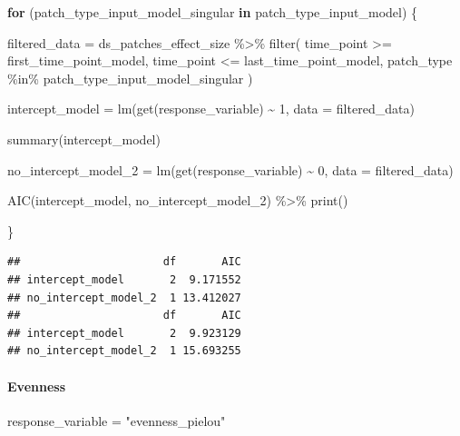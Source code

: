 \documentclass[
]{article}
\newenvironment{Shaded}{\begin{snugshade}}{\end{snugshade}}
\newcommand{\AttributeTok}[1]{\textcolor[rgb]{0.77,0.63,0.00}{#1}}
\newcommand{\ControlFlowTok}[1]{\textcolor[rgb]{0.13,0.29,0.53}{\textbf{#1}}}
\newcommand{\DecValTok}[1]{\textcolor[rgb]{0.00,0.00,0.81}{#1}}
\newcommand{\FunctionTok}[1]{\textcolor[rgb]{0.00,0.00,0.00}{#1}}
\newcommand{\NormalTok}[1]{#1}
\newcommand{\OtherTok}[1]{\textcolor[rgb]{0.56,0.35,0.01}{#1}}
\newcommand{\SpecialCharTok}[1]{\textcolor[rgb]{0.00,0.00,0.00}{#1}}
\newcommand{\StringTok}[1]{\textcolor[rgb]{0.31,0.60,0.02}{#1}}
\begin{document}
\begin{Shaded}
\begin{Highlighting}[]
\ControlFlowTok{for}\NormalTok{ (patch\_type\_input\_model\_singular }\ControlFlowTok{in}\NormalTok{ patch\_type\_input\_model) \{}
  
\NormalTok{  filtered\_data }\OtherTok{=}\NormalTok{ ds\_patches\_effect\_size }\SpecialCharTok{\%\textgreater{}\%}
    \FunctionTok{filter}\NormalTok{(}
\NormalTok{        time\_point }\SpecialCharTok{\textgreater{}=}\NormalTok{ first\_time\_point\_model,}
\NormalTok{        time\_point }\SpecialCharTok{\textless{}=}\NormalTok{ last\_time\_point\_model,}
\NormalTok{        patch\_type }\SpecialCharTok{\%in\%}\NormalTok{ patch\_type\_input\_model\_singular}
\NormalTok{    )}
  
\NormalTok{  intercept\_model }\OtherTok{=} \FunctionTok{lm}\NormalTok{(}\FunctionTok{get}\NormalTok{(response\_variable) }\SpecialCharTok{\textasciitilde{}}
                         \DecValTok{1}\NormalTok{,}
                       \AttributeTok{data =}\NormalTok{ filtered\_data)}
  
  \FunctionTok{summary}\NormalTok{(intercept\_model)}
  
\NormalTok{  no\_intercept\_model\_2 }\OtherTok{=} \FunctionTok{lm}\NormalTok{(}\FunctionTok{get}\NormalTok{(response\_variable) }\SpecialCharTok{\textasciitilde{}}
                              \DecValTok{0}\NormalTok{,}
                            \AttributeTok{data =}\NormalTok{ filtered\_data)}
  
  \FunctionTok{AIC}\NormalTok{(intercept\_model, no\_intercept\_model\_2) }\SpecialCharTok{\%\textgreater{}\%}
    \FunctionTok{print}\NormalTok{()}
  
\NormalTok{\}}
\end{Highlighting}
\end{Shaded}

\begin{verbatim}
##                      df       AIC
## intercept_model       2  9.171552
## no_intercept_model_2  1 13.412027
##                      df       AIC
## intercept_model       2  9.923129
## no_intercept_model_2  1 15.693255
\end{verbatim}

\hypertarget{evenness-3}{%
\paragraph{Evenness}\label{evenness-3}}

\begin{Shaded}
\begin{Highlighting}[]
\NormalTok{response\_variable }\OtherTok{=} \StringTok{"evenness\_pielou"}
\end{Highlighting}
\end{Shaded}
\end{document}
